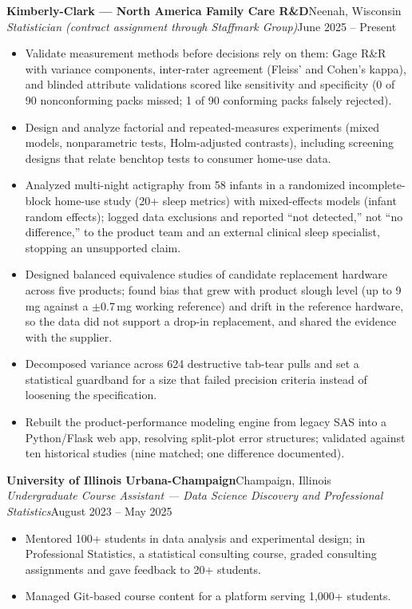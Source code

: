 \documentclass[letterpaper,10pt]{article}
\newcommand{\role}[4]{
    \Needspace{5\baselineskip}
    \vspace{1pt}
    \textbf{#1}\hfill #2\\
    \textit{#3}\hfill #4\\[-3pt]
}
\begin{document}
\role{Kimberly-Clark --- North America Family Care R\&D}{Neenah, Wisconsin}
{Statistician (contract assignment through Staffmark Group)}{June 2025 -- Present}
\begin{itemize}
  \item Validate measurement methods before decisions rely on them: Gage R\&R with variance components, inter-rater agreement (Fleiss' and Cohen's kappa), and blinded attribute validations scored like sensitivity and specificity (0 of 90 nonconforming packs missed; 1 of 90 conforming packs falsely rejected).
  \item Design and analyze factorial and repeated-measures experiments (mixed models, nonparametric tests, Holm-adjusted contrasts), including screening designs that relate benchtop tests to consumer home-use data.
  \item Analyzed multi-night actigraphy from 58 infants in a randomized incomplete-block home-use study (20+ sleep metrics) with mixed-effects models (infant random effects); logged data exclusions and reported ``not detected,'' not ``no difference,'' to the product team and an external clinical sleep specialist, stopping an unsupported claim.
  \item Designed balanced equivalence studies of candidate replacement hardware across five products; found bias that grew with product slough level (up to 9\,mg against a $\pm$0.7\,mg working reference) and drift in the reference hardware, so the data did not support a drop-in replacement, and shared the evidence with the supplier.
  \item Decomposed variance across 624 destructive tab-tear pulls and set a statistical guardband for a size that failed precision criteria instead of loosening the specification.
  \item Rebuilt the product-performance modeling engine from legacy SAS into a Python/Flask web app, resolving split-plot error structures; validated against ten historical studies (nine matched; one difference documented).
\end{itemize}

\role{University of Illinois Urbana-Champaign}{Champaign, Illinois}
{Undergraduate Course Assistant --- Data Science Discovery and Professional Statistics}{August 2023 -- May 2025}
\begin{itemize}
  \item Mentored 100+ students in data analysis and experimental design; in Professional Statistics, a statistical consulting course, graded consulting assignments and gave feedback to 20+ students.
  \item Managed Git-based course content for a platform serving 1,000+ students.
\end{itemize}
\end{document}
